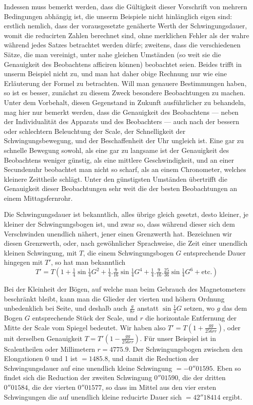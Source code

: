 Indessen muss bemerkt werden, dass die Gültigkeit dieser Vorschrift von mehrern Bedingungen abhängig ist, die unserm Beispiele nicht hinlänglich eigen sind: erstlich nemlich, dass der vorausgesetzte genäherte Werth der Schwingungsdauer, womit die reducirten Zahlen berechnet sind, ohne merklichen Fehler als der wahre während jedes Satzes betrachtet werden dürfe; zweitens, dass die verschiedenen Sätze, die man vereinigt, unter nahe gleichen Umständen (so weit sie die Genauigkeit des Beobachtens afficiren können) beobachtet seien. Beides trifft in unserm Beispiel nicht zu, und man hat daher obige Rechnung nur wie eine Erläuterung der Formel zu betrachten. Will man genauere Bestimmungen haben, so ist es besser, zunächst zu diesem Zweck besondere Beobachtungen zu machen. Unter dem Vorbehalt, diesen Gegenstand in Zukunft ausführlicher zu behandeln, mag hier nur bemerkt werden, dass die Genauigkeit des Beobachtens — neben der Individualität des Apparats und des Beobachters — auch nach der bessern oder schlechtern Beleuchtung der Scale, der Schnelligkeit der Schwingungsbewegung, und der Beschaffenheit der Uhr ungleich ist. Eine gar zu schnelle Bewegung sowohl, als eine gar zu langsame ist der Genauigkeit des Beobachtens weniger günstig, als eine mittlere Geschwindigkeit, und an einer Secundenuhr beobachtet man nicht so scharf, als an einem Chronometer, welches kleinere Zeittheile schlägt. Unter den günstigsten Umständen übertrifft die Genauigkeit dieser Beobachtungen sehr weit die der besten Beobachtungen an einem Mittagsfernrohr.

Die Schwingungsdauer ist bekanntlich, alles übrige gleich gesetzt, desto kleiner, je kleiner der Schwingungsbogen ist, und zwar so, dass während dieser sich dem Verschwinden unendlich nähert, jener einen Grenzwerth hat. Bezeichnen wir diesen Grenzwerth, oder, nach gewöhnlicher Sprachweise, die Zeit einer unendlich kleinen Schwingung, mit $T$, die einem Schwingungsbogen $G$ entsprechende Dauer hingegen mit $T'$, so hat man bekanntlich
\[
T'=T(1+\tfrac14\sin\tfrac14G^2+\tfrac14.\tfrac9{16}\sin\tfrac14G^4+\tfrac14.\tfrac9{16}.\tfrac{25}{36}\sin\tfrac14G^6+\text{etc.})
\]

Bei der Kleinheit der Bögen, auf welche man beim Gebrauch des Magnetometers beschränkt bleibt, kann man die Glieder der vierten und höhern Ordnung unbedenklich bei Seite, und deshalb auch $\frac{g}{8r}$ anstatt $\sin\tfrac14G$ setzen, wo $g$ das dem Bogen $G$ entsprechende Stück der Scale, und $r$ die horizontale Entfernung der Mitte der Scale vom Spiegel bedeutet. Wir haben also $T'=T(1+\frac{gg}{256rr})$, oder mit derselben Genauigkeit $T=T'(1-\frac{gg}{256rr})$. Für unser Beispiel ist in Scalentheilen oder Millimetern $r=4775.9$. Der Schwingungsbogen zwischen den Elongationen 0 und 1 ist $=1485.8$, und damit die Reduction der Schwingungsdauer auf eine unendlich kleine Schwingung $=-0''01595$. Eben so findet sich die Reduction der zweiten Schwingung $0''01590$, die der dritten $0''01584$, die der vierten $0''01577$, so dass im Mittel aus den vier ersten Schwingungen die auf unendlich kleine reducirte Dauer sich $=42''18414$ ergibt.

